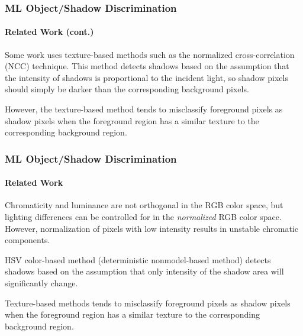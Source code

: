 
\begin{frame}
    \frametitle{ML Object/Shadow Discrimination}
    \framesubtitle{Related Work (cont.)}

    Some work uses texture-based methods such as the normalized 
    cross-correlation (NCC) technique. This method detects 
    shadows based on the assumption that the intensity of shadows 
    is proportional to the incident light, so shadow pixels should 
    simply be darker than the corresponding background pixels.

    \bigskip

    However, the texture-based method tends to misclassify foreground
    pixels as shadow pixels when the foreground region has a similar
    texture to the corresponding background region.

\end{frame}


\else

\begin{frame}
    \frametitle{ML Object/Shadow Discrimination}
    \framesubtitle{Related Work}
    
    Chromaticity and luminance are not orthogonal in the RGB color 
    space, but lighting differences can be controlled for in the 
    {\em normalized} RGB color space.
    However, normalization of pixels with low intensity results
    in unstable chromatic components.

    \bigskip
    
    HSV color-based method (deterministic nonmodel-based method) 
    detects shadows based on the assumption that 
    only intensity of the shadow area will significantly change. 
    
    \bigskip

    Texture-based methods tends to misclassify foreground
    pixels as shadow pixels when the foreground region has a similar
    texture to the corresponding background region.

\end{frame}

\fi


